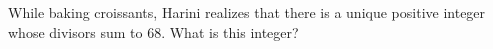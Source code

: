 While baking croissants, Harini realizes that there is a unique positive integer whose divisors sum to $68$. What is this integer?
